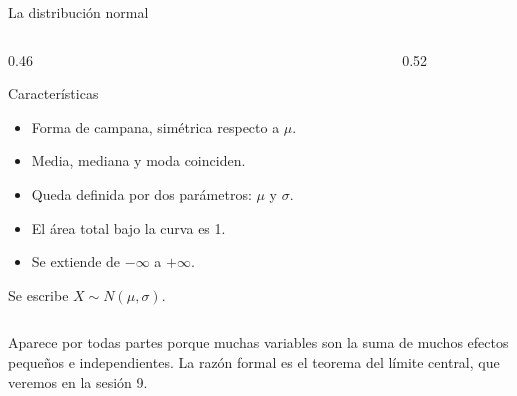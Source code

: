\documentclass[aspectratio=169,10pt]{beamer}
\newcommand{\curvanormal}[1]{%
  \draw[uniGris,->] (-3.4,0) -- (3.5,0);
  \draw[uniAzul,thick,domain=-3.3:3.3,samples=90,smooth]
    plot (\x,{2.1*exp(-0.5*\x*\x)});
  #1}
\begin{document}
\begin{frame}{La distribución normal}
  \begin{columns}[T,onlytextwidth]
    \begin{column}{0.46\textwidth}
      \footnotesize
      \begin{block}{Características}
        \begin{itemize}
          \item Forma de campana, simétrica respecto a $\mu$.
          \item Media, mediana y moda coinciden.
          \item Queda definida por dos parámetros: $\mu$ y $\sigma$.
          \item El área total bajo la curva es 1.
          \item Se extiende de $-\infty$ a $+\infty$.
        \end{itemize}
      \end{block}
      Se escribe $X\sim N(\mu,\sigma)$.
    \end{column}
    \begin{column}{0.52\textwidth}
      \centering
    \end{column}
  \end{columns}

  \vspace{0.02cm}
  {\scriptsize\color{uniGris} Aparece por todas partes porque muchas
  variables son la suma de muchos efectos pequeños e independientes. La razón
  formal es el teorema del límite central, que veremos en la sesión 9.}
\end{frame}
\end{document}
